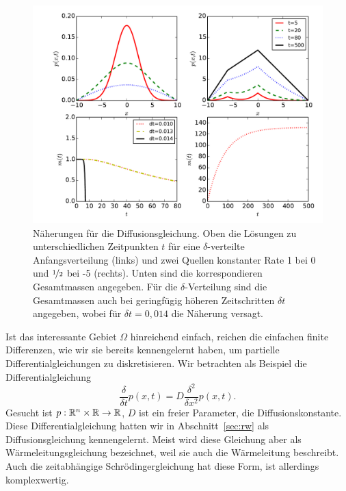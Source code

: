 \begin{figure}
  \centering
  \includegraphics[width=\textwidth]{plots/waermeleitung}
  \caption{Näherungen für die Diffusionsgleichung. Oben die Lösungen
    zu unterschiedlichen Zeitpunkten $t$ für eine $\delta$-verteilte
    Anfangsverteilung (links) und zwei Quellen konstanter Rate 1 bei 0
    und $\nicefrac{1}{2}$ bei -5 (rechts). Unten sind die
    korrespondieren Gesamtmassen angegeben. Für die
    $\delta$-Verteilung sind die Gesamtmassen auch bei geringfügig
    höheren Zeitschritten $\delta t$ angegeben, wobei für $\delta
    t=0,014$ die Näherung versagt.}
  \label{fig:waermeleitung}
\end{figure}

Ist das interessante Gebiet $\Omega$ hinreichend einfach, reichen
die einfachen finite Differenzen, wie wir sie bereits kennengelernt haben, um partielle
Differentialgleichungen zu diskretisieren.  Wir betrachten als
Beispiel die Differentialgleichung
\begin{equation}
  \label{eq:diffdgl}
  \frac{\delta}{\delta t} p(x, t) =
  D\frac{\delta^2}{\delta x^2} p(x, t).
\end{equation}
Gesucht ist $p:\mathbb{R}^n\times\mathbb{R}\to\mathbb{R}$, $D$ ist ein freier Parameter,
die Diffusionskonstante. Diese Differentialgleichung hatten wir in
Abschnitt~\ref{sec:rw} als Diffusionsgleichung kennengelernt. Meist
wird diese Gleichung aber als Wärmeleitungsgleichung bezeichnet, weil
sie auch die Wärmeleitung beschreibt. Auch die zeitabhängige
Schrödingergleichung hat diese Form, ist allerdings komplexwertig.

